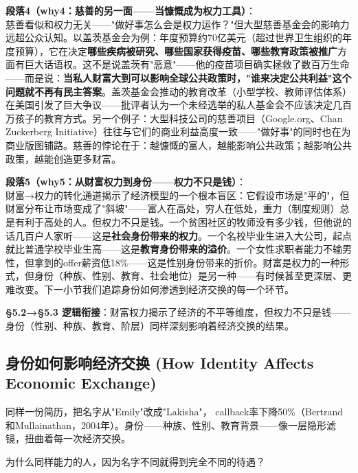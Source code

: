 \documentclass[../main.tex]{subfiles}
\begin{document}
{	\textbf{段落4（why4：慈善的另一面——当慷慨成为权力工具）}：\\
	慈善看似和权力无关——"做好事怎么会是权力运作？"但大型慈善基金会的影响力远超公众认知。以盖茨基金会为例：年度预算约70亿美元（超过世界卫生组织的年度预算），它在决定\textbf{哪些疾病被研究、哪些国家获得疫苗、哪些教育政策被推广}方面有巨大话语权。这不是说盖茨有"恶意"——他的疫苗项目确实拯救了数百万生命——而是说：\textbf{当私人财富大到可以影响全球公共政策时，"谁来决定公共利益"这个问题就不再有民主答案}。盖茨基金会推动的教育改革（小型学校、教师评估体系）在美国引发了巨大争议——批评者认为一个未经选举的私人基金会不应该决定几百万孩子的教育方式。另一个例子：大型科技公司的慈善项目（Google.org、Chan Zuckerberg Initiative）往往与它们的商业利益高度一致——"做好事"的同时也在为商业版图铺路。慈善的悖论在于：越慷慨的富人，越能影响公共政策；越影响公共政策，越能创造更多财富。

	\textbf{段落5（why5：从财富权力到身份——权力不只是钱）}：\\
	财富→权力的转化通道揭示了经济模型的一个根本盲区：它假设市场是"平的"，但财富分布让市场变成了"斜坡"——富人在高处，穷人在低处，重力（制度规则）总是有利于高处的人。但权力不只是钱。一个贫困社区的牧师没有多少钱，但他说的话几百户人家听——这是\textbf{社会身份带来的权力}。一个名校毕业生进入大公司，起点就比普通学校毕业生高——这是\textbf{教育身份带来的溢价}。一个女性求职者能力不输男性，但拿到的offer薪资低18\%——这是性别身份带来的折价。财富是权力的一种形式，但身份（种族、性别、教育、社会地位）是另一种——有时候甚至更深层、更难改变。下一小节我们追踪身份如何渗透到经济交换的每一个环节。

	\textbf{§5.2→§5.3 逻辑衔接}：财富权力揭示了经济的不平等维度，但权力不只是钱——身份（性别、种族、教育、阶层）同样深刻影响着经济交换的结果。

	\subsection{身份如何影响经济交换 (How Identity Affects Economic Exchange)}
	\begin{motivation}
		同样一份简历，把名字从"Emily"改成"Lakisha"， callback率下降50\%（Bertrand和Mullainathan，2004年）。身份——种族、性别、教育背景——像一层隐形滤镜，扭曲着每一次经济交换。
	\end{motivation}
	\begin{questionbox}
		为什么同样能力的人，因为名字不同就得到完全不同的待遇？
	\end{questionbox}

}
\end{document}
